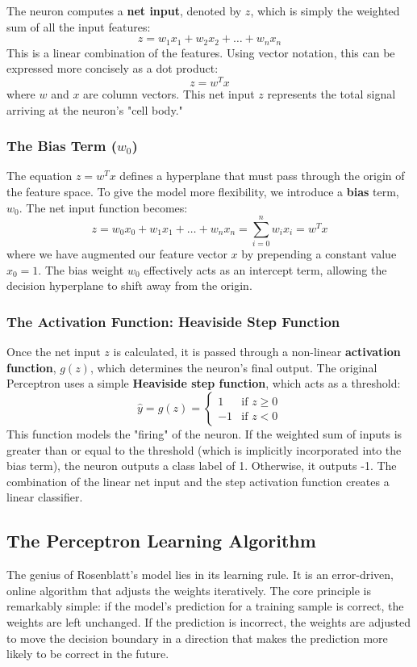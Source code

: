 The neuron computes a \textbf{net input}, denoted by $z$, which is simply the weighted sum of all the input features:
$$ z = w_1 x_1 + w_2 x_2 + \dots + w_n x_n $$
This is a linear combination of the features. Using vector notation, this can be expressed more concisely as a dot product:
$$ z = w^T x $$
where $w$ and $x$ are column vectors. This net input $z$ represents the total signal arriving at the neuron's "cell body."

\subsubsection*{The Bias Term ($w_0$)}
The equation $z = w^T x$ defines a hyperplane that must pass through the origin of the feature space. To give the model more flexibility, we introduce a \textbf{bias} term, $w_0$. The net input function becomes:
$$ z = w_0 x_0 + w_1 x_1 + \dots + w_n x_n = \sum_{i=0}^{n} w_i x_i = w^T x $$
where we have augmented our feature vector $x$ by prepending a constant value $x_0 = 1$. The bias weight $w_0$ effectively acts as an intercept term, allowing the decision hyperplane to shift away from the origin.

\subsubsection*{The Activation Function: Heaviside Step Function}
Once the net input $z$ is calculated, it is passed through a non-linear \textbf{activation function}, $g(z)$, which determines the neuron's final output. The original Perceptron uses a simple \textbf{Heaviside step function}, which acts as a threshold:
$$ \hat{y} = g(z) = \begin{cases} 
      1 & \text{if } z \ge 0 \\
      -1 & \text{if } z < 0 
   \end{cases} $$
This function models the "firing" of the neuron. If the weighted sum of inputs is greater than or equal to the threshold (which is implicitly incorporated into the bias term), the neuron outputs a class label of 1. Otherwise, it outputs -1. The combination of the linear net input and the step activation function creates a linear classifier.

\subsection*{The Perceptron Learning Algorithm}
The genius of Rosenblatt's model lies in its learning rule. It is an error-driven, online algorithm that adjusts the weights iteratively. The core principle is remarkably simple: if the model's prediction for a training sample is correct, the weights are left unchanged. If the prediction is incorrect, the weights are adjusted to move the decision boundary in a direction that makes the prediction more likely to be correct in the future.

